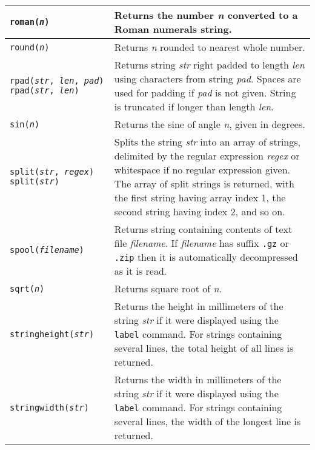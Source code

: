 \begin{longtable}{|p{5cm}|p{7cm}|}
\hline

\texttt{roman(\textit{n})} &
Returns the number \textit{n} converted to a Roman numerals string. \\

\hline

\texttt{round(\textit{n})} &
Returns \textit{n} rounded to nearest whole number. \\

\hline

\texttt{rpad(\textit{str}, \textit{len}, \textit{pad})}
\texttt{rpad(\textit{str}, \textit{len})} &
Returns string \textit{str} right padded to length \textit{len}
using characters from string \textit{pad}.
Spaces are used for padding if \textit{pad} is not given.
String is truncated if longer than length \textit{len}. \\

\hline

\texttt{sin(\textit{n})} &
Returns the sine of angle \textit{n}, given in degrees. \\

\hline

\texttt{split(\textit{str}, \textit{regex})}
\texttt{split(\textit{str})} &
Splits the string \textit{str} into an array of strings, delimited by the
regular expression \textit{regex} or whitespace if no regular expression given.
The array of split strings is returned,
with the first string having array index 1, the
second string having index 2, and so on. \\

\hline

\texttt{spool(\textit{filename})} &
Returns string containing contents of text file \textit{filename}.
If \textit{filename} has suffix
\texttt{.gz} or \texttt{.zip}
then it is automatically decompressed as it is read.  \\

\hline

\texttt{sqrt(\textit{n})} &
Returns square root of \textit{n}. \\

\hline

\texttt{stringheight(\textit{str})} &
Returns the height in millimeters of the string \textit{str}
if it were displayed using the \texttt{label} command.
For strings containing several lines, the total height of all
lines is returned.  \\

\hline

\texttt{stringwidth(\textit{str})} &
Returns the width in millimeters of the string \textit{str}
if it were displayed using the \texttt{label} command.
For strings containing several lines, the width of the longest
line is returned.  \\


\end{longtable}
